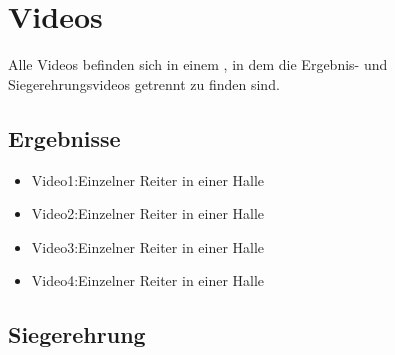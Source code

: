 \chapter{Videos}

Alle Videos befinden sich in einem
\href{https://uni-muenster.sciebo.de/s/FCpRRcPnGg2HgHa}{\color{blue}{Sciebo-Ordner}}
, in dem die Ergebnis- und Siegerehrungsvideos getrennt zu finden sind.
\section{Ergebnisse}
\begin{itemize}
\item \label{vid1} Video1:Einzelner Reiter in einer Halle 
\item \label{vid2} Video2:Einzelner Reiter in einer Halle 
\item \label{vid3} Video3:Einzelner Reiter in einer Halle
\item \label{vid4} Video4:Einzelner Reiter in einer Halle  
\end{itemize}
\section{Siegerehrung}
